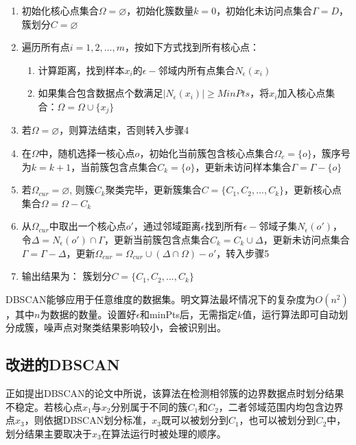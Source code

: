 \begin{enumerate}
	\item 初始化核心点集合$ \Omega = \varnothing  $，初始化簇数量$ k=0 $，初始化未访问点集合$ \Gamma = D $，簇划分$ C=\varnothing $
	\item 遍历所有点$ i=1,2,...,m $，按如下方式找到所有核心点：
	      \begin{enumerate}
		      \item 计算距离，找到样本$ x_i $的$ \epsilon- $邻域内所有点集合$ N_{\epsilon}(x_i) $
		      \item 如果集合包含数据点个数满足$ |N_{\epsilon}(x_i)| \geq MinPts $，将$ x_i $加入核心点集合：$ \Omega = \Omega \cup \{x_j\} $
	      \end{enumerate}
	\item 若$ \Omega = \varnothing $，则算法结束，否则转入步骤4
	\item 在$ \Omega $中，随机选择一核心点$ o $，初始化当前簇包含核心点集合$ \Omega_{c}=\{o\} $，簇序号为$ k=k+1 $，当前簇包含点集合$ C_k=\{o\} $，更新未访问样本集合$ \Gamma = \Gamma - \{o\} $
	\item 若$ \Omega_{cur} = \varnothing $, 则簇$ C_k $聚类完毕，更新簇集合$ C=\{C_1,C_2,...,C_k\} $，更新核心点集合$ \Omega = \Omega - C_k $
	\item 从$ \Omega_{cur} $中取出一个核心点$ o' $，通过邻域距离$ \epsilon $找到所有$ \epsilon- $邻域子集$ N_{\epsilon}(o')  $，令$ \Delta = N_{\epsilon}(o') \cap \Gamma $，更新当前簇包含点集合$ C_k = C_k \cup \Delta $，更新未访问点集合$ \Gamma = \Gamma - \Delta $，更新$ \Omega_{cur} = \Omega_{cur}\cup(\Delta\cap\Omega)-o' $，转入步骤5
	\item 输出结果为： 簇划分$ C=\{C_1,C_2,...,C_k\} $
\end{enumerate}

DBSCAN能够应用于任意维度的数据集。明文算法最坏情况下的复杂度为$ O(n^2) $，其中$ n $为数据的数量。设置好$ \epsilon $和minPts后，无需指定$ k $值，运行算法即可自动划分成簇，噪声点对聚类结果影响较小，会被识别出。

\subsection{改进的DBSCAN}
正如提出DBSCAN的论文\cite{ester1996density}中所说，该算法在检测相邻簇的边界数据点时划分结果不稳定。若核心点$ x_1 $与$ x_2 $分别属于不同的簇$ C_1 $和$ C_2 $，二者邻域范围内均包含边界点$ x_3 $，则依据DBSCAN划分标准，$ x_3 $既可以被划分到$ C_1 $，也可以被划分到$ C_2 $中，划分结果主要取决于$ x_3 $在算法运行时被处理的顺序。

